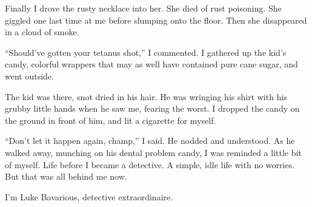 Finally I drove the rusty necklace into her. She died of rust
poisoning. She giggled one last time at me before slumping onto the
floor. Then she disappeared in a cloud of smoke.

``Should've gotten your tetanus shot,'' I
commented. I gathered up the kid's candy, colorful wrappers
that may as well have contained pure cane sugar, and went
outside.



The kid was there, snot dried in his hair. He was wringing his
shirt with his grubby little hands when he saw me, fearing the
worst. I dropped the candy on the ground in front of him, and lit a
cigarette for myself.

``Don't let it happen again, champ,'' I said. He
nodded and understood. As he walked away, munching on his dental
problem candy, I was reminded a little bit of myself. Life before I
became a detective. A simple, idle life with no worries. But that
was all behind me now.



I'm Luke Bavarious, detective extraordinaire. 

 



